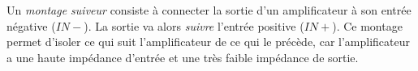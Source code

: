 Un \emph{montage suiveur} consiste à connecter la sortie d'un amplificateur à son entrée négative ($IN-$). La sortie va alors \emph{suivre} l'entrée positive ($IN+$). Ce montage permet d'isoler ce qui suit l'amplificateur de ce qui le précède, car l'amplificateur a une haute impédance d'entrée et une très faible impédance de sortie.